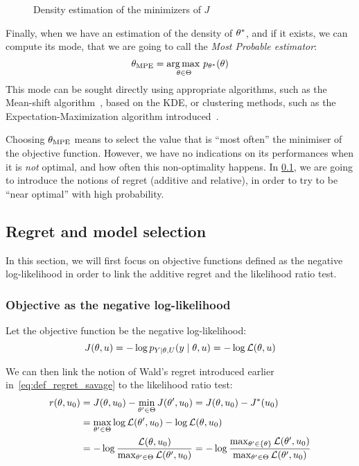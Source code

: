 \documentclass[../../Main_ManuscritThese.tex]{subfiles}
\newcommand\imgpath{/home/victor/acadwriting/Manuscrit/Text/Chapter3/img/}
\begin{document}
\begin{figure}[ht]
  \centering
  
  \caption{\label{fig:theta_star_samples} Density estimation of the minimizers of $J$}
\end{figure}

Finally, when we have an estimation of the density of $\theta^*$, and if it exists, we can compute its mode, that we are going to call the \emph{Most Probable estimator}:
\begin{equation}
  {\theta}_{\mathrm{MPE}} = \operatorname*{arg\,max \,}_{\theta \in \Theta} p_{\theta^*}(\theta)
\end{equation}
This mode can be sought directly using appropriate algorithms, such as the Mean-shift algorithm~\cite{yizong_cheng_mean_1995}, based on the KDE, or clustering methods, such as the Expectation-Maximization algorithm introduced~\cite{dempster_maximum_1977}.

Choosing ${\theta}_{\mathrm{MPE}}$ means to select the value that is ``most often'' the minimiser of the objective function. However, we have no indications on its performances when it is \emph{not} optimal, and how often this non-optimality happens. 
In \cref{sec:regret}, we are going to introduce the notions of regret (additive and relative), in order to try to be ``near optimal'' with high probability.


\subsection{Regret and model selection}
\label{sec:regret}
In this section, we will first focus on objective functions defined as the negative log-likelihood in order to link the additive regret and the likelihood ratio test.
\subsubsection{Objective as the negative log-likelihood}

Let the objective function be the negative log-likelihood:
\begin{equation}
  J(\theta, u) = - \log p_{Y\mid \theta, U}(y \mid \theta, u) = -\log \mathcal{L}(\theta,u)
\end{equation}

We can then link the notion of Wald's regret introduced earlier in~\cref{eq:def_regret_savage} to the likelihood ratio test:
  \begin{align}
    r(\theta,u_0) &= J(\theta, u_0) - \min_{\theta^{\prime}\in\Theta}J(\theta^{\prime}, u_0) = J(\theta,u_0) - J^*(u_0)  \\
                 &= \max_{\theta^{\prime}\in\Theta} \log \mathcal{L}(\theta^{\prime}, u_0) - \log \mathcal{L}(\theta, u_0) \\
                 &= -\log \frac{\mathcal{L}(\theta, u_0)}{\max_{\theta^{\prime}\in\Theta}\mathcal{L}(\theta^{\prime}, u_0)} = -\log \frac{\max_{\theta^{\prime}\in\{\theta\}}\mathcal{L}(\theta^{\prime}, u_0)}{\max_{\theta^{\prime}\in\Theta}\mathcal{L}(\theta^{\prime}, u_0)}
  \end{align}
\end{document}
